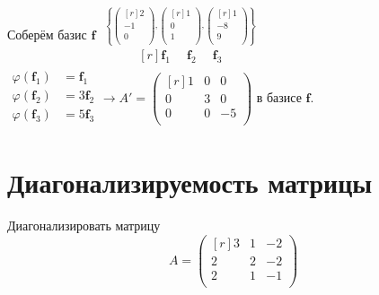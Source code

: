Соберём базис $\textbf{f}$ %
$  %
\begin{matrix}
\overset{\left\{
\begin{pmatrix*}[r]
2\\ -1\\ 0\\ 
\end{pmatrix*},
\begin{pmatrix*}[r]
1\\ 0\\ 1\\ 
\end{pmatrix*},
\begin{pmatrix*}[r]
1\\ -8\\ 9\\ 
\end{pmatrix*}
\right\}}{
\begin{matrix*}[r]
\textbf{f$_1$}\phantom{3}&\textbf{f$_2$}&\phantom{2}\textbf{f$_3$}
\end{matrix*}}
\end{matrix}
$\\
$
\left.
\begin{aligned} %
\varphi (\textbf{f$_1$})&=\textbf{f$_1$}\\ %
\varphi (\textbf{f$_2$})&=3\textbf{f$_2$} \\
\varphi (\textbf{f$_3$})&=5\textbf{f$_3$}\\
\end{aligned}
\right.
\to A'=
\begin{pmatrix*}[r]
 1 & 0 & 0\\
 0 & 3 & 0\\
 0 & 0 & -5\\
\end{pmatrix*}
$
в базисе $\textbf{f}$.\\ %

\section{Диагонализируемость матрицы}
\begin{prim}
Диагонализировать матрицу\\
$$
 A=
\begin{pmatrix*}[r]
 3 & 1 & -2\\
 2 & 2 & -2\\
 2 & 1 & -1\\
\end{pmatrix*}
$$
\end{prim}\\

